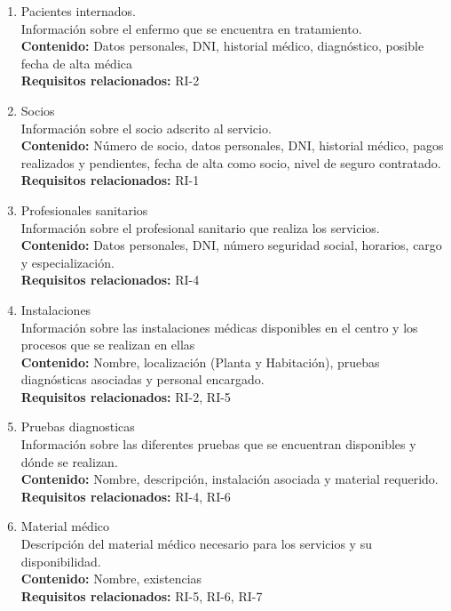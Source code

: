 \documentclass[12pt, spanish]{article}
\begin{document}
\begin{enumerate}[start =1, label={\bfseries RI-\arabic*.}]
  \item Pacientes internados. 
  \\ Información sobre el enfermo que se encuentra en tratamiento. 
  \\ \textbf{Contenido:} Datos personales, DNI, historial médico, diagnóstico, posible fecha de alta médica
  \\ \textbf{Requisitos relacionados:} RI-2
  \item Socios 
  \\ Información sobre el socio adscrito al servicio.
  \\ \textbf{Contenido:} Número de socio, datos personales, DNI, historial médico, pagos realizados y pendientes, fecha de alta como socio, nivel de seguro contratado.
  \\ \textbf{Requisitos relacionados:} RI-1
  \item Profesionales sanitarios 
  \\ Información sobre el profesional sanitario que realiza los servicios.
  \\ \textbf{Contenido:} Datos personales, DNI, número seguridad social, horarios, cargo y especialización.
  \\ \textbf{Requisitos relacionados:} RI-4
  \item Instalaciones 
  \\ Información sobre las instalaciones médicas disponibles en el centro y los procesos que se realizan en ellas 
  \\ \textbf{Contenido:} Nombre, localización (Planta y Habitación), pruebas diagnósticas asociadas y personal encargado.
  \\ \textbf{Requisitos relacionados:} RI-2, RI-5
  \item Pruebas diagnosticas 
  \\ Información sobre las diferentes pruebas que se encuentran disponibles y dónde se realizan.
  \\ \textbf{Contenido:} Nombre, descripción, instalación asociada y material requerido.
  \\ \textbf{Requisitos relacionados:} RI-4, RI-6
  \item Material médico 
  \\ Descripción del material médico necesario para los servicios y su disponibilidad. 
  \\ \textbf{Contenido:} Nombre, existencias
  \\ \textbf{Requisitos relacionados:} RI-5, RI-6, RI-7

\end{enumerate}
\end{document}

